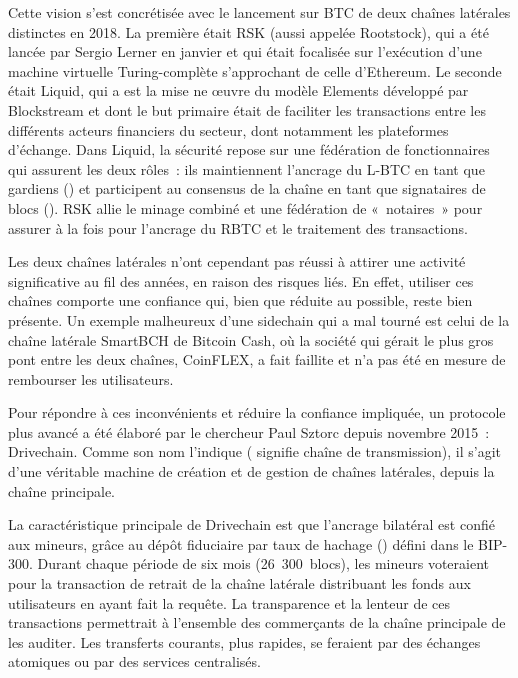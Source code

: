 Cette vision s'est concrétisée avec le lancement sur BTC de deux chaînes latérales distinctes en 2018. La première était RSK (aussi appelée Rootstock), qui a été lancée par Sergio Lerner en janvier et qui était focalisée sur l'exécution d'une machine virtuelle Turing-complète s'approchant de celle d'Ethereum. Le seconde était Liquid, qui a est la mise ne œuvre du modèle Elements développé par Blockstream et dont le but primaire était de faciliter les transactions entre les différents acteurs financiers du secteur, dont notamment les plateformes d'échange. Dans Liquid, la sécurité repose sur une fédération de fonctionnaires qui assurent les deux rôles~: ils maintiennent l'ancrage du L-BTC en tant que gardiens () et participent au consensus de la chaîne en tant que signataires de blocs (). RSK allie le minage combiné et une fédération de «~notaires~» pour assurer à la fois pour l'ancrage du RBTC et le traitement des transactions.

Les deux chaînes latérales n'ont cependant pas réussi à attirer une activité significative au fil des années, en raison des risques liés. En effet, utiliser ces chaînes comporte une confiance qui, bien que réduite au possible, reste bien présente. Un exemple malheureux d'une sidechain qui a mal tourné est celui de la chaîne latérale SmartBCH de Bitcoin Cash, où la société qui gérait le plus gros pont entre les deux chaînes, CoinFLEX, a fait faillite et n'a pas été en mesure de rembourser les utilisateurs.


Pour répondre à ces inconvénients et réduire la confiance impliquée, un protocole plus avancé a été élaboré par le chercheur Paul Sztorc depuis novembre 2015~: Drivechain. Comme son nom l'indique ( signifie chaîne de transmission), il s'agit d'une véritable machine de création et de gestion de chaînes latérales, depuis la chaîne principale.

La caractéristique principale de Drivechain est que l'ancrage bilatéral est confié aux mineurs, grâce au dépôt fiduciaire par taux de hachage () défini dans le BIP-300. Durant chaque période de six mois (26~300~blocs), les mineurs voteraient pour la transaction de retrait de la chaîne latérale distribuant les fonds aux utilisateurs en ayant fait la requête. La transparence et la lenteur de ces transactions permettrait à l'ensemble des commerçants de la chaîne principale de les auditer. Les transferts courants, plus rapides, se feraient par des échanges atomiques ou par des services centralisés.

